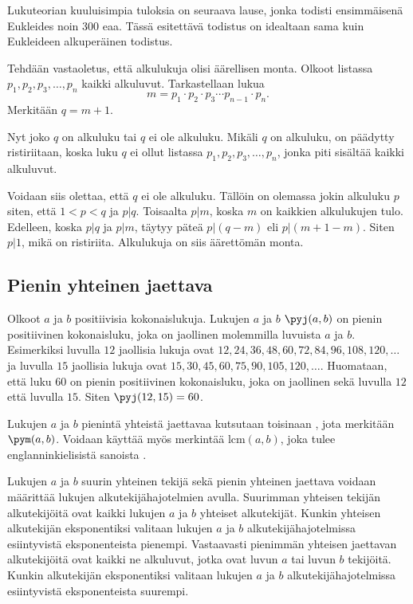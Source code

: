 Lukuteorian kuuluisimpia tuloksia on seuraava lause, jonka todisti ensimmäisenä Eukleides noin 300 eaa. Tässä esitettävä todistus on idealtaan sama kuin Eukleideen alkuperäinen todistus.


\begin{todistus}
Tehdään vastaoletus, että alkulukuja olisi äärellisen monta. Olkoot listassa
$p_1, p_2, p_3, \ldots, p_n$ kaikki alkuluvut. Tarkastellaan lukua
\[
m = p_1\cdot p_2\cdot p_3 \cdots p_{n-1}\cdot p_n.
\]
Merkitään $q=m+1$.

Nyt joko $q$ on alkuluku tai $q$ ei ole alkuluku. Mikäli $q$ on alkuluku, on päädytty ristiriitaan, koska luku $q$ ei ollut listassa $p_1, p_2, p_3, \ldots, p_n$, jonka piti sisältää kaikki alkuluvut.

Voidaan siis olettaa, että $q$ ei ole alkuluku. Tällöin on olemassa jokin alkuluku $p$ siten, että $1<p<q$ ja $p|q$. Toisaalta $p|m$, koska $m$ on kaikkien alkulukujen tulo. Edelleen, koska $p|q$ ja $p|m$, täytyy päteä $p|(q-m)$ eli $p|(m+1-m)$. Siten $p|1$, mikä on ristiriita. Alkulukuja on siis äärettömän monta.
\end{todistus}


\subsection*{Pienin yhteinen jaettava}
Olkoot $a$ ja $b$ positiivisia kokonaislukuja. Lukujen $a$ ja $b$  $\pyj(a, b)$ on pienin positiivinen kokonaisluku, joka on jaollinen molemmilla luvuista $a$ ja $b$. Esimerkiksi luvulla $12$ jaollisia lukuja ovat $12, 24, 36, 48, 60, 72, 84, 96, 108, 120, \ldots$ ja luvulla $15$ jaollisia lukuja ovat $15, 30, 45, 60, 75, 90, 105, 120, \ldots$. Huomataan, että luku $60$ on pienin positiivinen kokonaisluku, joka on jaollinen sekä luvulla $12$ että luvulla $15$. Siten $\pyj(12, 15) = 60$.

Lukujen $a$ ja $b$ pienintä yhteistä jaettavaa kutsutaan toisinaan , jota merkitään $\pym(a, b)$. Voidaan käyttää myös merkintää $\mathrm{lcm}(a, b)$, joka tulee englanninkielisistä sanoista .

Lukujen $a$ ja $b$ suurin yhteinen tekijä sekä pienin yhteinen jaettava voidaan määrittää lukujen alkutekijähajotelmien avulla. Suurimman yhteisen tekijän alkutekijöitä ovat kaikki lukujen $a$ ja $b$ yhteiset alkutekijät. Kunkin yhteisen alkutekijän eksponentiksi valitaan lukujen $a$ ja $b$ alkutekijähajotelmissa esiintyvistä eksponenteista pienempi. Vastaavasti pienimmän yhteisen jaettavan alkutekijöitä ovat kaikki ne alkuluvut, jotka ovat luvun $a$ tai luvun $b$ tekijöitä. Kunkin alkutekijän eksponentiksi valitaan lukujen $a$ ja $b$ alkutekijähajotelmissa esiintyvistä eksponenteista suurempi.

